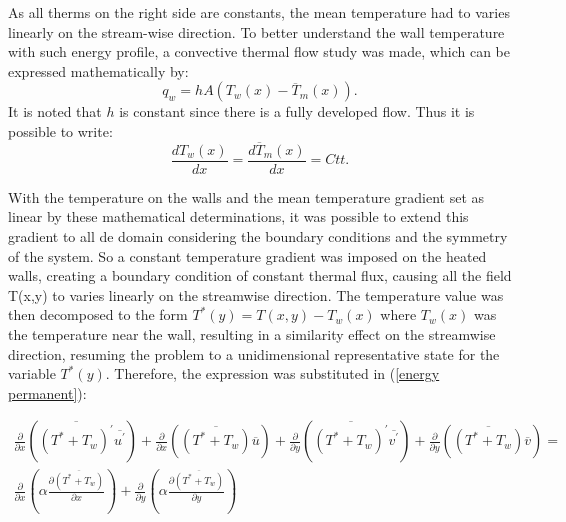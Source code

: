 \documentclass[10pt]{article} %
\begin{document}
As all therms on the right side are constants, the mean temperature had to varies linearly on the stream-wise direction.  
To better understand the wall temperature with such energy profile, a convective thermal flow study was made, which can be expressed mathematically by:
\begin{equation}
q_w = h A \left( T_w(x) - \overline{T}_m(x)\right).
\end{equation}
It is noted that $h$ is constant since there is a fully developed flow. Thus it is possible to write:
\begin{equation}
\frac{d T_w(x)}{d x} = \frac{d \overline{T}_m(x)}{d x} = Ctt.
\end{equation}	

With the temperature on the walls and the mean temperature gradient set as linear by these mathematical determinations, it was possible to extend this gradient to all de domain considering the boundary conditions and the symmetry of the system. So a constant temperature gradient was imposed on the heated walls, creating a boundary condition of constant thermal flux, causing all the field T(x,y) to varies linearly on the streamwise direction. The temperature value was then decomposed to the form $ T^\ast(y) = T(x,y) - T_w(x) $ where $T_w(x)$ was the temperature near the wall, resulting in a similarity effect on the streamwise direction, resuming the problem to a unidimensional representative state for the variable $T^\ast(y)$. Therefore, the expression was substituted in (\ref{energy permanent}):



\begin{equation}
\begin{split}
\frac{\partial{}}{\partial{x}} \left(\overline{(T^\ast + T_w)^\prime} \overline{ u^\prime}\right) + \frac{\partial{}}{\partial{x}}\left(\overline{(T^\ast + T_w)} \overline{u}\right)+ 
\frac{\partial{}}{\partial{y}} \left(\overline{(T^\ast + T_w)^\prime} \overline{ v^\prime}\right) + \frac{\partial{}}{\partial{y}}\left(\overline{(T^\ast + T_w)} \overline{v}\right) = \\
{\frac{\partial{}}{\partial{x}}} \left(\alpha {\frac{\partial{\overline{(T^\ast + T_w)}}}{\partial{x}}} \right) +
{\frac{\partial{}}{\partial{y}}} \left(\alpha {\frac{\partial{\overline{(T^\ast + T_w)}}}{\partial{y}}} \right) 
\end{split}
\end{equation}
\end{document}
